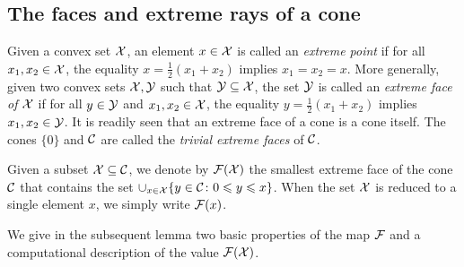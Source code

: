 \documentclass[main]{subfiles}
\begin{document}
\subsection{The faces and extreme rays of a cone}

Given a convex set $\mathcal{X}$, an element $x \in \mathcal{X}$ is called an \emph{extreme point} if for all $x_1, x_2 \in \mathcal{X}$, the equality $x = \frac{1}{2}(x_1 + x_2)$ implies $x_1 = x_2 = x$.
More generally, given two convex sets $\mathcal{X},\mathcal{Y}$ such that $\mathcal{Y} \subseteq \mathcal{X}$, the set $\mathcal{Y}$ is called an \emph{extreme face of $\mathcal{X}$} if for all $y \in \mathcal{Y}$ and $x_1, x_2 \in \mathcal{X}$, the equality $y = \frac{1}{2}(x_1 + x_2)$ implies $x_1, x_2 \in \mathcal{Y}$. It is readily seen that an extreme face of a cone is a cone itself. The cones $\{0\}$ and $\mathcal{C}$ are called the \emph{trivial extreme faces} of $\mathcal{C}$.

\begin{definition}
\label{def:F_definition}
Given a subset $\mathcal{X} \subseteq \mathcal{C}$,
we denote by $\mathcal{F}(\mathcal{X})$
  the smallest extreme face of the cone $\mathcal{C}$ that contains the set $\cup_{x \in \mathcal{X}} \{ y \in \mathcal{C} \colon 0 \leqslant y \leqslant x \}$.  
  When the set $\mathcal{X}$ is reduced to a single element $x$, we simply write $\mathcal{F}(x)$.
\end{definition}

We give in the subsequent lemma two basic properties of the map $\mathcal{F}$ and a computational description of the value $\mathcal{F}(\mathcal{X})$.
\end{document}
